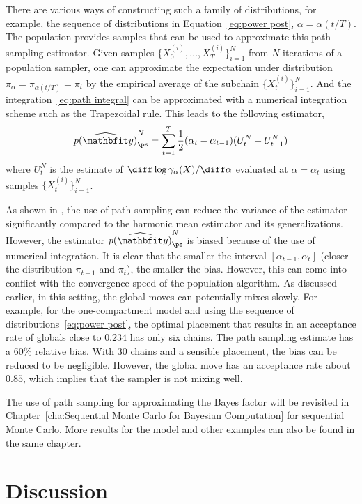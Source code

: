 There are various ways of constructing such a family of distributions, for
example, the sequence of distributions in Equation~\eqref{eq:power post},
$\alpha = \alpha(t/T)$. The population \mcmc provides samples that can be used
to approximate this path sampling estimator. Given samples
$\{X_0^{(i)},\dots,X_T^{(i)}\}_{i=1}^N$ from $N$ iterations of a population
\mcmc sampler, one can approximate the expectation under distribution
$\pi_{\alpha} = \pi_{\alpha(t/T)} = \pi_t$ by the empirical average of the
subchain $\{X_t^{(i)}\}_{i=1}^N$. And the integration~\eqref{eq:path integral}
can be approximated with a numerical integration scheme such as the
Trapezoidal rule. This leads to the following estimator,
\begin{equation}
  \widehat{p(\data)}_{\ps}^N = \sum_{t=1}^T
  \frac{1}{2}(\alpha_t - \alpha_{t-1})(U_t^N + U_{t-1}^N)
\end{equation}
where $U_t^N$ is the estimate of
$\diff\log\gamma_{\alpha}(X)/\diff\alpha$ evaluated at $\alpha = \alpha_t$
using samples $\{X_t^{(i)}\}_{i=1}^N$.

As shown in \cite{Calderhead:2009bd}, the use of path sampling can reduce the
variance of the estimator significantly compared to the harmonic mean
estimator and its generalizations. However, the estimator
$\widehat{p(\data)}_{\ps}^N$ is biased because of the use of numerical
integration. It is clear that the smaller the interval
$[\alpha_{t-1},\alpha_t]$ (closer the distribution $\pi_{t-1}$ and $\pi_t$),
the smaller the bias. However, this can come into conflict with the
convergence speed of the population \mcmc algorithm. As discussed earlier, in
this setting, the global moves can potentially mixes slowly. For example, for
the one-compartment \pet model and using the sequence of
distributions~\eqref{eq:power post}, the optimal placement that results in an
acceptance rate of globals close to $0.234$ has only six chains. The path
sampling estimate has a 60\% relative bias. With 30 chains and a sensible
placement, the bias can be reduced to be negligible. However, the global move
has an acceptance rate about $0.85$, which implies that the sampler is not
mixing well.

The use of path sampling for approximating the Bayes factor will be revisited
in Chapter~\ref{cha:Sequential Monte Carlo for Bayesian Computation} for
sequential Monte Carlo. More results for the \pet model and other examples can
also be found in the same chapter.

\section{Discussion}
\label{sec:Monte Carlo Discussion}

